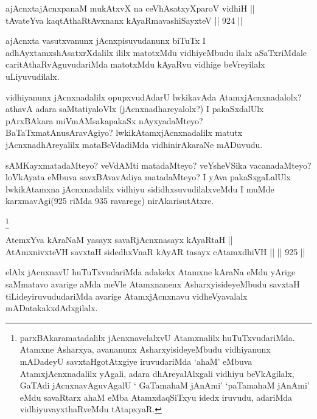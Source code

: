 

\begin{shl}
ajAcnxtajAcnxpanaM mukAtxvX na ceVhAsatxyXparoV vidhiH || \\
tAvateYva kaqtAthaRtAvxnanx kAyaRmavashiSayxteV \hfill || 924 ||  
\end{shl}

\begin{artha}
ajAcnxta vasutxvanunx jAcnxpisuvudanunx biTuTx I adhAyxtamxshAsatxrXdalilx ililx matotxMdu vidhiyeMbudu ilalx aSaTxriMdale caritAthaRvAguvudariMda matotxMdu kAyaRvu vidhige beVreyilalx uLiyuvudilalx.
\end{artha}

\begin{artha}
vidhiyanunx jAcnxnadalilx opupxvudAdarU lwkikavAda AtamxjAcnxnadalolx? athavA adara saMtatiyaloVlx (jAcnxnadhareyalolx?) I pakaSxdalUlx pArxBAkara miVmAMsakapakaSx nAyxyadaMteyo? BaTaTxmatAnusAravAgiyo? lwkikAtamxjAcnxnadalilx matutx jAcnxnadhAreyalilx mataBeVdadiMda vidhinirAkaraNe mADuvudu.
\end{artha}

\begin{artha}
sAMKayxmatadaMteyo? veVdAMti matadaMteyo? veYsheVSika vacanadaMteyo? loVkAyata eMbuva savxBAvavAdiya matadaMteyo? I yAva pakaSxgaLalUlx lwkikAtamxna jAcnxnadalilx vidhiyu sididhxsuvudilalxveMdu I muMde karxmavAgi(925 riMda 935 ravarege) nirAkarisutAtxre.
\end{artha}
\footnote{parxBAkaramatadalilx jAcnxnavelalxvU Atamxnalilx huTuTxvudariMda. Atamxne Asharxya, avananunx AsharxyisideyeMbudu vidhiyanunx mADadeyU savxtaHgotAtxgiye iruvudariMda `ahaM' eMbuva AtamxjAcnxnadalilx yAgali, adara dhAreyalAlxgali vidhiyu beVkAgilalx, GaTAdi jAcnxnavAguvAgalU ` GaTamahaM jAnAmi' `paTamahaM jAnAmi' eMdu savaRtarx ahaM eMba AtamxdaqSiTxyu idedx iruvudu, adariMda vidhiyuvayxthaRveMdu tAtapxyaR.}


\begin{shl}
AtemxYva kAraNaM yasayx savaRjAcnxnasayx kAyaRtaH || \\
AtAmxnivxteVH savxtaH sidedhxVnaR kAyAR tasayx cA\s \s tamxdhiVH ||  \hfill || 925 ||  
\end{shl}

\begin{artha}
elAlx jAcnxnavU huTuTxvudariMda adakekx Atamxne kAraNa eMdu yArige saMmatavo avarige aMda meVle Atamxnanenx AsharxyisideyeMbudu savxtaH tiLideyiruvududariMda avarige AtamxjAcnxnavu vidheVyavalalx mADatakakxdAdxgilalx.
\end{artha}

